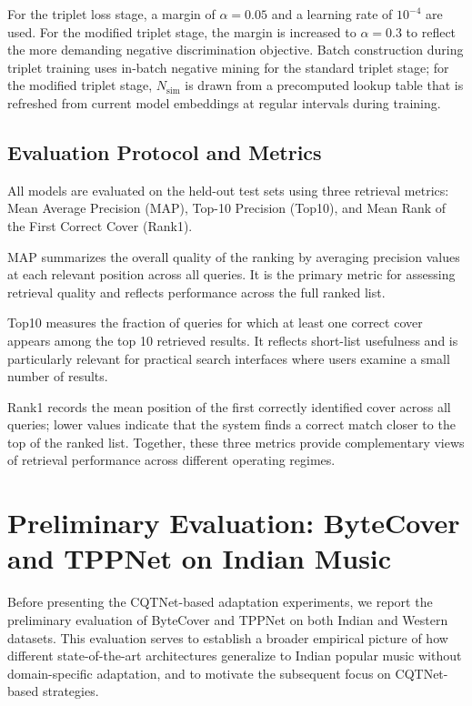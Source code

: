 \documentclass[conference]{IEEEtran}
\begin{document}
For the triplet loss stage, a margin of $\alpha = 0.05$ and a learning rate of $10^{-4}$ are used. For the modified triplet stage, the margin is increased to $\alpha = 0.3$ to reflect the more demanding negative discrimination objective. Batch construction during triplet training uses in-batch negative mining for the standard triplet stage; for the modified triplet stage, $N_{\text{sim}}$ is drawn from a precomputed lookup table that is refreshed from current model embeddings at regular intervals during training.

\subsection{Evaluation Protocol and Metrics}

All models are evaluated on the held-out test sets using three retrieval metrics: Mean Average Precision (MAP), Top-10 Precision (Top10), and Mean Rank of the First Correct Cover (Rank1).

MAP summarizes the overall quality of the ranking by averaging precision values at each relevant position across all queries. It is the primary metric for assessing retrieval quality and reflects performance across the full ranked list.

Top10 measures the fraction of queries for which at least one correct cover appears among the top 10 retrieved results. It reflects short-list usefulness and is particularly relevant for practical search interfaces where users examine a small number of results.

Rank1 records the mean position of the first correctly identified cover across all queries; lower values indicate that the system finds a correct match closer to the top of the ranked list. Together, these three metrics provide complementary views of retrieval performance across different operating regimes.


\section{Preliminary Evaluation: ByteCover and TPPNet on Indian Music}

Before presenting the CQTNet-based adaptation experiments, we report the preliminary evaluation of ByteCover and TPPNet on both Indian and Western datasets. This evaluation serves to establish a broader empirical picture of how different state-of-the-art architectures generalize to Indian popular music without domain-specific adaptation, and to motivate the subsequent focus on CQTNet-based strategies.
\end{document}

